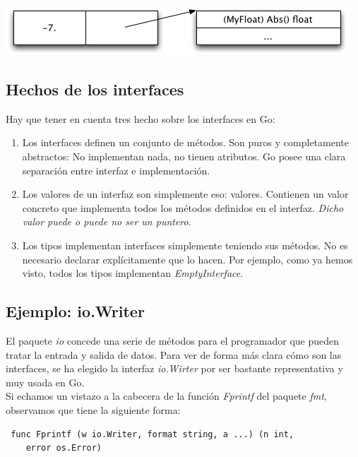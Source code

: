 	\begin{center} \includegraphics{oo/interface_value3.png} \end{center}
	
	\subsection{Hechos de los interfaces}
	
	Hay que tener en cuenta tres hecho sobre los interfaces en Go:
	
	\begin{enumerate} \item Los interfaces definen un conjunto de métodos. Son
	puros y completamente abstractos: No implementan nada, no tienen atributos.
	Go posee una clara separación entre interfaz e implementación.  \item Los
	valores de un interfaz son simplemente eso: valores. Contienen un valor
	concreto que implementa todos los métodos definidos en el interfaz.
	\textit{Dicho valor puede o puede no ser un puntero}.  \item Los tipos
	implementan interfaces simplemente teniendo sus métodos. No es necesario
	declarar explícitamente que lo hacen. Por ejemplo, como ya hemos visto,
	todos los tipos implementan \textit{EmptyInterface}.  \end{enumerate}
	
	\subsection{Ejemplo: io.Writer}
	
	El paquete \textit{io} concede una serie de métodos para el programador que
	pueden tratar la entrada y salida de datos. Para ver de forma más clara cómo
	son las interfaces, se ha elegido la interfaz \textit{io.Wirter} por ser
	bastante representativa y muy usada en Go.\\
	
	Si echamos un vistazo a la cabecera de la función \textit{Fprintf} del
	paquete \textit{fmt}, observamos que tiene la siguiente forma:
	
	\begin{verbatim} func Fprintf (w io.Writer, format string, a ...) (n int,
	error os.Error) \end{verbatim}
	
